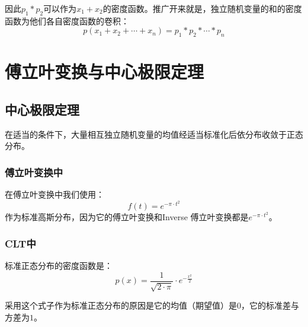 因此$p_1*p_2$可以作为$x_1+x_2$的密度函数。推广开来就是，独立随机变量的和的密度函数为他们各自密度函数的卷积：
\begin{equation}
	p(x_1+x_2+\cdots+x_n)=p_1*p_2*\cdots *p_n
\end{equation}

\section{傅立叶变换与中心极限定理}
\subsection{中心极限定理}
在适当的条件下，大量相互独立随机变量的均值经适当标准化后依分布收敛于正态分布。
\subsubsection{傅立叶变换中}
在傅立叶变换中我们使用：
$$
	f(t)=e^{-\pi\cdot t^2}
$$
作为标准高斯分布，因为它的傅立叶变换和Inverse 傅立叶变换都是$e^{-\pi\cdot t^2}$。
\subsubsection{CLT中}
标准正态分布的密度函数是：
$$
	p(x)=\frac{1}{\sqrt{2\cdot\pi}}\cdot e^{-\frac{x^2}{2}}
$$

采用这个式子作为标准正态分布的原因是它的均值（期望值）是$0$，它的标准差与方差为$1$。

